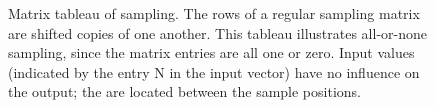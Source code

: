 \begin{figure}
\centerline{
}
\caption[Regular Sampling and Matrix Tableau]{
Matrix tableau of sampling.
The rows of a regular sampling matrix 
are shifted copies of one another.
This tableau illustrates all-or-none sampling,
since the matrix entries are all one or zero.
Input values (indicated by the entry N in the input vector)
have no influence on the output;
the are located between the sample positions.
}
\label{f2:regular.tab}
\end{figure}
